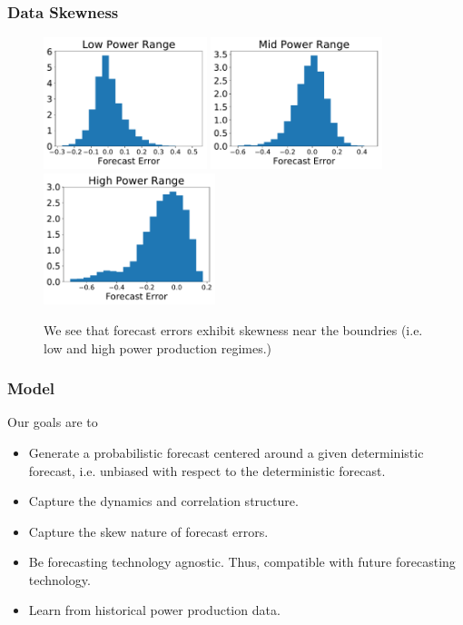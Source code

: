\documentclass[aspectratio=169]{beamer}\usepackage[utf8]{inputenc}
\begin{document}
\begin{frame}\frametitle{Data Skewness}
\begin{figure}
  \includegraphics[width=47.5mm,scale=1]{plots/hist_low.pdf}
  \includegraphics[width=50mm,scale=1]{plots/hist_mid.pdf}
  \includegraphics[width=50mm,scale=1]{plots/hist_high.pdf}
  \caption{We see that forecast errors exhibit skewness near the boundries (i.e. low and high power production regimes.)}
\end{figure}
\end{frame}

\begin{frame}\frametitle{Model}
Our goals are to
\begin{itemize}
  \item Generate a probabilistic forecast centered around a given deterministic forecast, i.e. unbiased with respect to the deterministic forecast.
  \item Capture the dynamics and correlation structure.
  \item Capture the skew nature of forecast errors.
  \item Be forecasting technology agnostic. Thus, compatible with future forecasting technology.
  \item Learn from historical power production data.
\end{itemize}
\end{frame}
\end{document}
